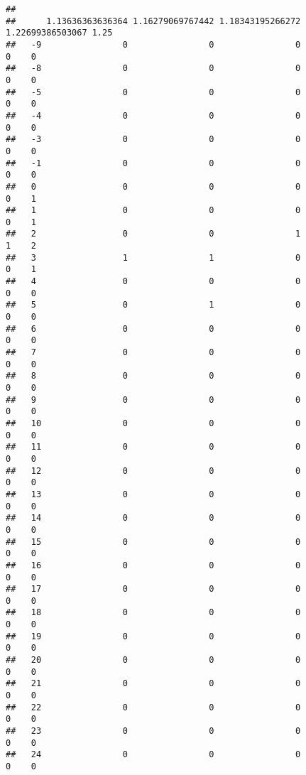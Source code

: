 \documentclass[]{article}
\begin{document}
\begin{verbatim}
##     
##      1.13636363636364 1.16279069767442 1.18343195266272 1.22699386503067 1.25
##   -9                0                0                0                0    0
##   -8                0                0                0                0    0
##   -5                0                0                0                0    0
##   -4                0                0                0                0    0
##   -3                0                0                0                0    0
##   -1                0                0                0                0    0
##   0                 0                0                0                0    1
##   1                 0                0                0                0    1
##   2                 0                0                1                1    2
##   3                 1                1                0                0    1
##   4                 0                0                0                0    0
##   5                 0                1                0                0    0
##   6                 0                0                0                0    0
##   7                 0                0                0                0    0
##   8                 0                0                0                0    0
##   9                 0                0                0                0    0
##   10                0                0                0                0    0
##   11                0                0                0                0    0
##   12                0                0                0                0    0
##   13                0                0                0                0    0
##   14                0                0                0                0    0
##   15                0                0                0                0    0
##   16                0                0                0                0    0
##   17                0                0                0                0    0
##   18                0                0                0                0    0
##   19                0                0                0                0    0
##   20                0                0                0                0    0
##   21                0                0                0                0    0
##   22                0                0                0                0    0
##   23                0                0                0                0    0
##   24                0                0                0                0    0

\end{verbatim}
\end{document}
